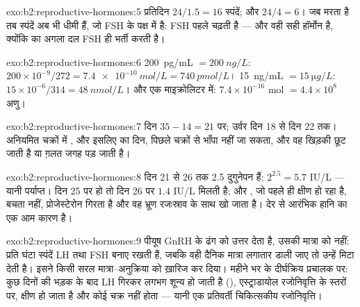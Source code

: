 \begin{solution}{exo:b2:reproductive-hormones:5}
प्रतिदिन $24/1.5 = 16$ स्पंदें; और $24/4 = 6$। जब  मरता है
तब स्पंदें अब भी धीमी हैं, जो FSH के पक्ष में है: FSH पहले चढ़ती है ---
और वही सही हॉर्मोन है, क्योंकि  का अगला दल FSH ही
भर्ती करती है।
\end{solution}

\begin{solution}{exo:b2:reproductive-hormones:6}
\qty{200}{pg/mL} $= \qty{200}{ng/L}$: $200\times 10^{-9}/272 =
\qty{7.4e-10}{mol/L} = \qty{740}{pmol/L}$। \qty{15}{ng/mL} $=
\qty{15}{\micro g/L}$: $15\times 10^{-6}/314 = \qty{48}{nmol/L}$। और
एक माइक्रोलिटर में: $7.4\times 10^{-16}$ mol $= 4.4\times 10^{8}$
अणु।
\end{solution}

\begin{solution}{exo:b2:reproductive-hormones:7}
 दिन $35 - 14 = 21$ पर; उर्वर दिन 18 से दिन 22 तक। अनियमित
चक्रों में , और इसलिए  का दिन,
पिछले चक्रों से भाँपा नहीं जा सकता, और वह खिड़की छूट जाती है या ग़लत
जगह पड़ जाती है।
\end{solution}

\begin{solution}{exo:b2:reproductive-hormones:8}
दिन 21 से 26 तक 2.5 दुगुनेपन हैं: $2^{2.5} = 5.7$ IU/L --- यानी पर्याप्त।
दिन 25 पर  हो तो दिन 26 पर $1.4$ IU/L मिलती है; और ,
जो पहले ही क्षीण हो रहा है, बचता नहीं, प्रोजेस्टेरोन गिरता है और वह
भ्रूण रजःस्राव के साथ खो जाता है। देर से  आरंभिक हानि का
एक आम कारण है।
\end{solution}

\begin{solution}{exo:b2:reproductive-hormones:9}
पीयूष GnRH के ढंग को उत्तर देता है, उसकी मात्रा को नहीं:
प्रति घंटा स्पंदें LH तथा FSH बनाए रखती हैं, जबकि वही दैनिक मात्रा
लगातार डाली जाए तो उन्हें मिटा देती है। इसने किसी सरल मात्रा--अनुक्रिया
को ख़ारिज कर दिया। महीने भर के दीर्घक्रिय प्रचालक पर: कुछ दिनों की भड़क
के बाद LH गिरकर लगभग शून्य हो जाती है (), एस्ट्राडायोल
रजोनिवृत्ति के स्तरों पर,  क्षीण हो जाता है और कोई चक्र
नहीं होता --- यानी एक प्रतिवर्ती चिकित्सकीय रजोनिवृत्ति।
\end{solution}

